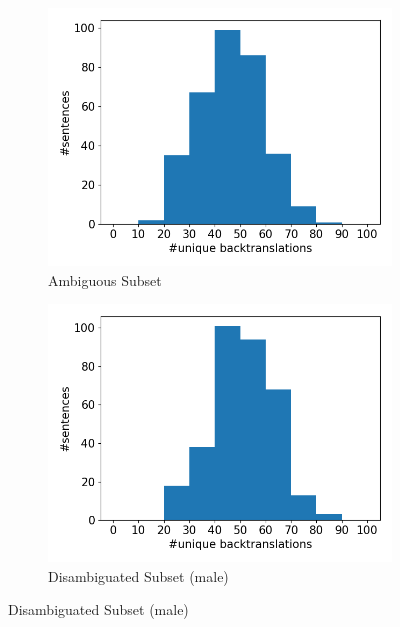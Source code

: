 \begin{figure}[!htb]
     \centering
     
     \begin{subfigure}{0.49\textwidth}
         \centering
         \includegraphics[width=\textwidth]{figures/uniqueness/unique_beam10/unique_back_original.png}
         \caption{Ambiguous Subset}
         \label{fig:uniqueness_ambiguous}
     \end{subfigure}
     \hfill
     \begin{subfigure}{0.49\textwidth}
         \centering
         \includegraphics[width=\textwidth]{figures/uniqueness/unique_beam10/unique_back_male.png}
         \caption{Disambiguated Subset (male)}
         \label{fig:uniqueness_male}

\end{subfigure}
\end{figure}
